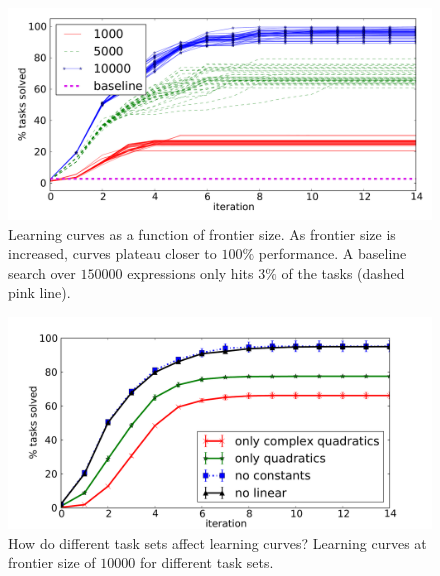 \documentclass{article}
\begin{document}
\setcounter{subfigure}{0} 
\begin{figure}[ht]
\centering
\includegraphics[width=1.0\linewidth]{figures/symreg3frontiers.pdf}
\caption{Learning curves as a function of frontier size.  As frontier
  size is increased, curves plateau closer to $100\%$ performance. A
  baseline search over $150000$ expressions only hits $3\%$ of the
  tasks (dashed pink line). \label{fig:symregLearning}}
\end{figure}
\begin{figure}[ht]
\includegraphics[width=1.07\linewidth]{figures/symRegDiffCurricula.pdf}
\caption{How do different task sets affect learning curves? Learning
  curves at frontier size of $10000$ for different task
  sets.} 
\label{fig:symregCurricula}

\end{figure}




\end{document}
